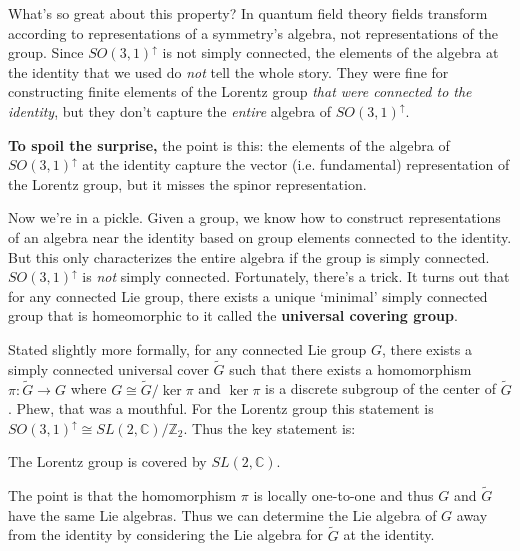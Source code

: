 \documentclass[12pt]{article}
\numberwithin{equation}{section}    %
\renewcommand{\tilde}{\widetilde}   %
\begin{document}
What's so great about this property? In quantum field theory fields transform according to representations of a symmetry's algebra, not representations of the group. Since $SO(3,1)^\uparrow$ is not simply connected, the elements of the algebra at the identity that we used do \textit{not} tell the whole story. They were fine for constructing finite elements of the Lorentz group \textit{that were connected to the identity}, but they don't capture the \textit{entire} algebra of $SO(3,1)^\uparrow$.

\vspace{.5em}
\begin{framed}
	\noindent\textbf{To spoil the surprise,} the point is this: the elements of the algebra of $SO(3,1)^\uparrow$ at the identity capture the vector (i.e. fundamental) representation of the Lorentz group, but it misses the spinor representation.
\end{framed}
\vspace{.5em}

Now we're in a pickle. Given a group, we know how to construct representations of an algebra near the identity based on group elements connected to the identity. But this only characterizes the entire algebra if the group is simply connected. $SO(3,1)^\uparrow$ is \textit{not} simply connected. Fortunately, there's a trick. It turns out that for any connected Lie group, there exists a unique `minimal' simply connected group that is homeomorphic to it called the \textbf{universal covering group}. 

Stated slightly more formally, for any connected Lie group $G$, there exists a simply connected universal cover $\tilde{G}$ such that there exists a homomorphism $\pi:\tilde G \to G$ where $G \cong \tilde G/\ker \pi$ and $\ker \pi$ is a discrete subgroup of the center of $\tilde G$. Phew, that was a mouthful. For the Lorentz group this statement is $SO(3,1)^\uparrow \cong SL(2,\mathbb{C})/\mathbb{Z}_2$. Thus the key statement is:
\begin{center}
The Lorentz group is covered by $SL(2,\mathbb{C})$.
\end{center}
The point is that the homomorphism $\pi$ is locally one-to-one and thus $G$ and $\tilde G$ have the same Lie algebras. Thus we can determine the Lie algebra of $G$ away from the identity by considering the  Lie algebra for $\tilde G$ at the identity.
\end{document}
